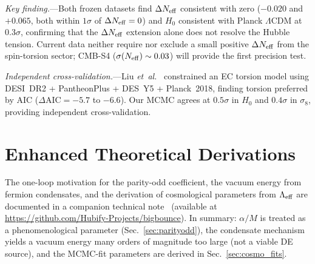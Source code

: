 \documentclass[aps,prd,twocolumn,superscriptaddress,showpacs,preprintnumbers,nofootinbib,longbibliography,floatfix]{revtex4-2}
\newcommand{\Leff}{\Lambda_{\rm eff}}
\newcommand{\Neff}{N_{\rm eff}}
\newcommand{\etal}{\textit{et~al.}}
\begin{document}
\textit{Key finding.}---Both frozen datasets find $\Delta\Neff$ consistent with zero ($-0.020$ and $+0.065$, both within $1\sigma$ of $\Delta\Neff = 0$) and $H_0$ consistent with Planck $\Lambda$CDM at $0.3\sigma$, confirming that the $\Delta\Neff$ extension alone does not resolve the Hubble tension. Current data neither require nor exclude a small positive $\Delta\Neff$ from the spin-torsion sector; CMB-S4 ($\sigma(\Neff) \sim 0.03$) will provide the first precision test.

\textit{Independent cross-validation.}---Liu \etal~\cite{ECTorsionDESI2025} constrained an EC torsion model using DESI~DR2 + PantheonPlus + DES~Y5 + Planck~2018, finding torsion preferred by AIC ($\Delta\text{AIC} = -5.7$ to $-6.6$). Our MCMC agrees at $0.5\sigma$ in $H_0$ and $0.4\sigma$ in $\sigma_8$, providing independent cross-validation.


\section{Enhanced Theoretical Derivations}\label{sec:derivations}
The one-loop motivation for the parity-odd coefficient, the vacuum energy from fermion condensates, and the derivation of cosmological parameters from $\Leff$ are documented in a companion technical note~\cite{Golden2026supplement} (available at \url{https://github.com/Hubify-Projects/bigbounce}). In summary: $\alpha/M$ is treated as a phenomenological parameter (Sec.~\ref{sec:parityodd}), the condensate mechanism yields a vacuum energy many orders of magnitude too large (not a viable DE source), and the MCMC-fit parameters are derived in Sec.~\ref{sec:cosmo_fits}.

\label{sec:oneloopfull}\label{sec:condensate}\label{sec:cosmo_derivation}


\end{document}
